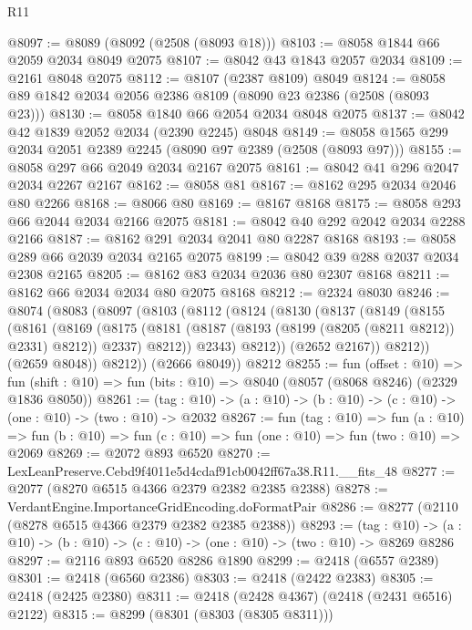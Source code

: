 \begin{lexlean}{R11}
\begin{coremodule}
@8097 := @8089 (@8092 (@2508 (@8093 @18)))
@8103 := @8058 @1844 @66 @2059 @2034 @8049 @2075
@8107 := @8042 @43 @1843 @2057 @2034
@8109 := @2161 @8048 @2075
@8112 := @8107 (@2387 @8109) @8049
@8124 := @8058 @89 @1842 @2034 @2056 @2386 @8109 (@8090 @23 @2386 (@2508 (@8093 @23)))
@8130 := @8058 @1840 @66 @2054 @2034 @8048 @2075
@8137 := @8042 @42 @1839 @2052 @2034 (@2390 @2245) @8048
@8149 := @8058 @1565 @299 @2034 @2051 @2389 @2245 (@8090 @97 @2389 (@2508 (@8093 @97)))
@8155 := @8058 @297 @66 @2049 @2034 @2167 @2075
@8161 := @8042 @41 @296 @2047 @2034 @2267 @2167
@8162 := @8058 @81
@8167 := @8162 @295 @2034 @2046 @80 @2266
@8168 := @8066 @80
@8169 := @8167 @8168
@8175 := @8058 @293 @66 @2044 @2034 @2166 @2075
@8181 := @8042 @40 @292 @2042 @2034 @2288 @2166
@8187 := @8162 @291 @2034 @2041 @80 @2287 @8168
@8193 := @8058 @289 @66 @2039 @2034 @2165 @2075
@8199 := @8042 @39 @288 @2037 @2034 @2308 @2165
@8205 := @8162 @83 @2034 @2036 @80 @2307 @8168
@8211 := @8162 @66 @2034 @2034 @80 @2075 @8168
@8212 := @2324 @8030
@8246 := @8074
    (@8083
      (@8097
        (@8103
          (@8112
            (@8124
              (@8130
                (@8137
                  (@8149
                    (@8155
                      (@8161
                        (@8169
                          (@8175
                            (@8181 (@8187 (@8193 (@8199 (@8205 (@8211 @8212)) @2331) @8212)) @2337)
                            @8212))
                        @2343)
                      @8212))
                  (@2652 @2167))
                @8212))
            (@2659 @8048))
          @8212))
      (@2666 @8049))
    @8212
@8255 := fun (offset : @10) =>
  fun (shift : @10) => fun (bits : @10) => @8040 (@8057 (@8068 @8246) (@2329 @1836 @8050))
@8261 := (tag : @10) -> (a : @10) -> (b : @10) -> (c : @10) -> (one : @10) -> (two : @10) -> @2032
@8267 := fun (tag : @10) =>
  fun (a : @10) => fun (b : @10) => fun (c : @10) => fun (one : @10) => fun (two : @10) => @2069
@8269 := @2072 @893 @6520
@8270 := LexLeanPreserve.Cebd9f4011e5d4cdaf91cb0042ff67a38.R11.__fits_48
@8277 := @2077 (@8270 @6515 @4366 @2379 @2382 @2385 @2388)
@8278 := VerdantEngine.ImportanceGridEncoding.doFormatPair
@8286 := @8277 (@2110 (@8278 @6515 @4366 @2379 @2382 @2385 @2388))
@8293 := (tag : @10) ->
  (a : @10) -> (b : @10) -> (c : @10) -> (one : @10) -> (two : @10) -> @8269 @8286
@8297 := @2116 @893 @6520 @8286 @1890
@8299 := @2418 (@6557 @2389)
@8301 := @2418 (@6560 @2386)
@8303 := @2418 (@2422 @2383)
@8305 := @2418 (@2425 @2380)
@8311 := @2418 (@2428 @4367) (@2418 (@2431 @6516) @2122)
@8315 := @8299 (@8301 (@8303 (@8305 @8311)))

\end{coremodule}
\end{lexlean}

